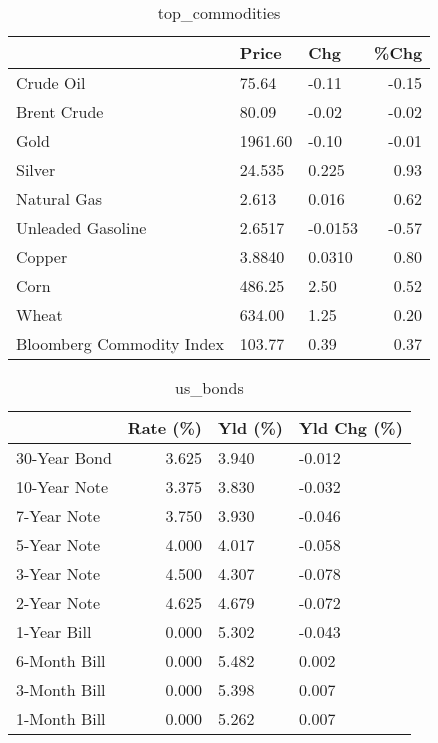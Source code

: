 \documentclass{article}%
\begin{document}
\begin{table}[htbp]%
\caption{top\_commodities}%
\centering%
\begin{adjustbox}{width=1\textwidth}%
\begin{tabular}{lllr}
\toprule
                          &   Price &     Chg &  \%Chg \\
\midrule
               Crude Oil  &   75.64 &   -0.11 & -0.15 \\
             Brent Crude  &   80.09 &   -0.02 & -0.02 \\
                    Gold  & 1961.60 &   -0.10 & -0.01 \\
                  Silver  &  24.535 &   0.225 &  0.93 \\
             Natural Gas  &   2.613 &   0.016 &  0.62 \\
       Unleaded Gasoline  &  2.6517 & -0.0153 & -0.57 \\
                  Copper  &  3.8840 &  0.0310 &  0.80 \\
                    Corn  &  486.25 &    2.50 &  0.52 \\
                   Wheat  &  634.00 &    1.25 &  0.20 \\
Bloomberg Commodity Index &  103.77 &    0.39 &  0.37 \\
\bottomrule
\end{tabular}
%
\end{adjustbox}%
\end{table}

%


\begin{table}[htbp]%
\caption{us\_bonds}%
\centering%
\begin{adjustbox}{width=1\textwidth}%
\begin{tabular}{lrll}
\toprule
             &  Rate (\%) & Yld (\%) & Yld Chg (\%) \\
\midrule
30-Year Bond &     3.625 &   3.940 &      -0.012 \\
10-Year Note &     3.375 &   3.830 &      -0.032 \\
 7-Year Note &     3.750 &   3.930 &      -0.046 \\
 5-Year Note &     4.000 &   4.017 &      -0.058 \\
 3-Year Note &     4.500 &   4.307 &      -0.078 \\
 2-Year Note &     4.625 &   4.679 &      -0.072 \\
 1-Year Bill &     0.000 &   5.302 &      -0.043 \\
6-Month Bill &     0.000 &   5.482 &       0.002 \\
3-Month Bill &     0.000 &   5.398 &       0.007 \\
1-Month Bill &     0.000 &   5.262 &       0.007 \\
\bottomrule
\end{tabular}
%
\end{adjustbox}%
\end{table}
\end{document}
